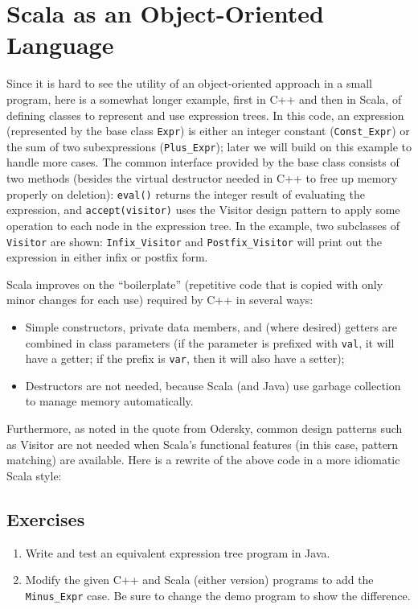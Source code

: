 \documentclass[11pt]{article}
\begin{document}
\section{Scala as an Object-Oriented Language}
Since it is hard to see the utility of an object-oriented approach
in a small program, here is a somewhat longer example, first in C++
and then in Scala, of defining classes to represent and use expression
trees. In this code, an expression (represented by the base class
\verb|Expr|) is either an integer constant (\verb|Const_Expr|) or
the sum of two subexpressions (\verb|Plus_Expr|); later we will
build on this example to handle more cases. The common interface
provided by the base class consists of two methods (besides the
virtual destructor needed in C++ to free up memory properly on
deletion): \verb|eval()| returns the integer result of evaluating
the expression, and \verb|accept(visitor)| uses the Visitor design
pattern to apply some operation to each node in the expression tree.
In the example, two subclasses of \verb|Visitor| are shown:
\verb|Infix_Visitor| and \verb|Postfix_Visitor| will print out the
expression in either infix or postfix form.

Scala improves on the ``boilerplate'' (repetitive code that is
copied with only minor changes for each use) required by C++ in
several ways:
\begin{itemize}
\item Simple constructors, private data members, and (where desired)
getters are combined in class parameters (if the parameter is
prefixed with \verb|val|, it will have a getter; if the prefix is
\verb|var|, then it will also have a setter);
\item Destructors are not needed, because Scala (and Java) use
garbage collection to manage memory automatically.
\end{itemize}
Furthermore, as noted in the quote from Odersky, common design
patterns such as Visitor are not needed when Scala's functional
features (in this case, pattern matching) are available. Here is a
rewrite of the above code in a more idiomatic Scala style:

\subsection*{Exercises}
\begin{enumerate}
  \item Write and test an equivalent expression tree program in Java.
  \item Modify the given C++ and Scala (either version) programs to
  add the \verb|Minus_Expr| case. Be sure to change the demo program
  to show the difference.
\end{enumerate}
\end{document}
